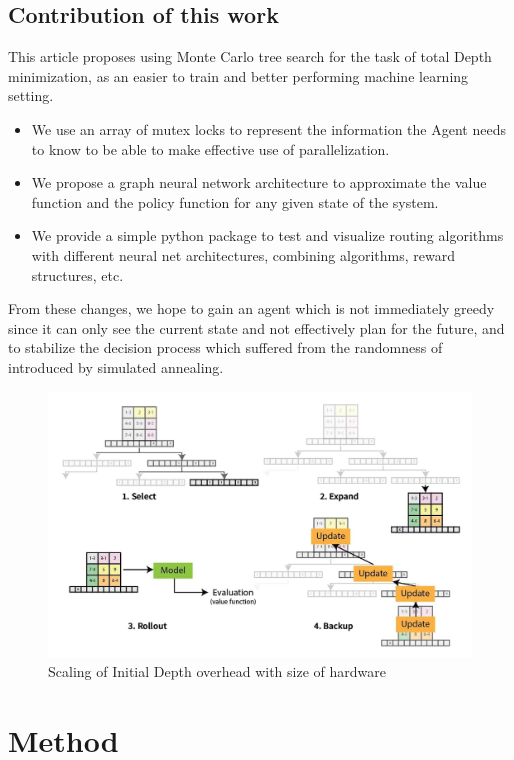 \documentclass[%
 reprint,
 amsmath,amssymb,
 aps,
]{revtex4-2}
\begin{document}
\subsection{\label{sec:intro-contribution}Contribution of this work}

This article proposes using Monte Carlo tree search for the task of total Depth minimization, as an easier to train and better performing machine learning setting.
\begin{itemize}
    \item We use an array of mutex locks to represent the information the Agent needs to know to be able to make effective use of parallelization.
    \item We propose a graph neural network architecture to approximate the value function and the policy function for any given state of the system.
    \item We provide a simple python package to test and visualize routing algorithms with different neural net architectures, combining algorithms, reward structures, etc.
\end{itemize}
From these changes, we hope to gain an agent which is not immediately greedy since it can only see the current state and not effectively plan for the future, and to stabilize the decision process which suffered from the randomness of introduced by simulated annealing.

\begin{figure}[t]
    \includegraphics[width=\linewidth]{images/mcts-steps.jpg}
    \caption{\label{fig:mcts-explainer}
        Scaling of Initial Depth overhead with size of hardware}
\end{figure}

\section{\label{sec:method}Method}
\end{document}
